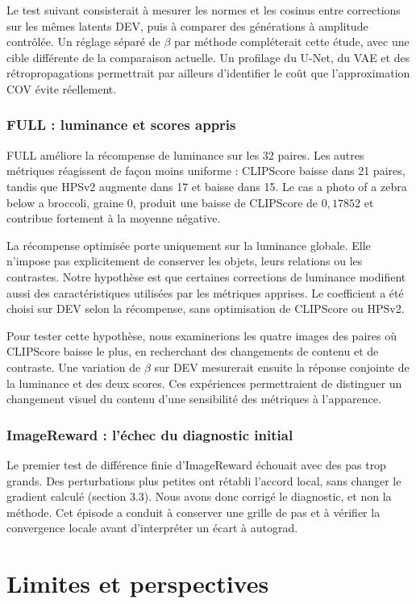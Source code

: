 \documentclass[11pt,a4paper]{article}
\begin{document}
Le test suivant consisterait à mesurer les normes et les cosinus entre corrections sur les mêmes latents DEV, puis à comparer des générations à amplitude contrôlée. Un réglage séparé de $\beta$ par méthode compléterait cette étude, avec une cible différente de la comparaison actuelle. Un profilage du U-Net, du VAE et des rétropropagations permettrait par ailleurs d'identifier le coût que l'approximation COV évite réellement.

\subsubsection*{FULL : luminance et scores appris}
FULL améliore la récompense de luminance sur les 32 paires. Les autres métriques réagissent de façon moins uniforme : CLIPScore baisse dans 21 paires, tandis que HPSv2 augmente dans 17 et baisse dans 15. Le cas \og a photo of a zebra below a broccoli\fg{}, graine 0, produit une baisse de CLIPScore de $0{,}17852$ et contribue fortement à la moyenne négative.

La récompense optimisée porte uniquement sur la luminance globale. Elle n'impose pas explicitement de conserver les objets, leurs relations ou les contrastes. Notre hypothèse est que certaines corrections de luminance modifient aussi des caractéristiques utilisées par les métriques apprises. Le coefficient a été choisi sur DEV selon la récompense, sans optimisation de CLIPScore ou HPSv2.

Pour tester cette hypothèse, nous examinerions les quatre images des paires où CLIPScore baisse le plus, en recherchant des changements de contenu et de contraste. Une variation de $\beta$ sur DEV mesurerait ensuite la réponse conjointe de la luminance et des deux scores. Ces expériences permettraient de distinguer un changement visuel du contenu d'une sensibilité des métriques à l'apparence.

\subsubsection*{ImageReward : l'échec du diagnostic initial}
Le premier test de différence finie d'ImageReward échouait avec des pas trop grands. Des perturbations plus petites ont rétabli l'accord local, sans changer le gradient calculé (section 3.3). Nous avons donc corrigé le diagnostic, et non la méthode. Cet épisode a conduit à conserver une grille de pas et à vérifier la convergence locale avant d'interpréter un écart à autograd.

\section{Limites et perspectives}
\end{document}
